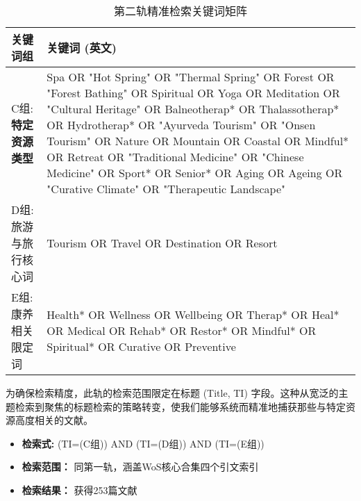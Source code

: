 \documentclass[UTF8, 12pt, a4paper, twoside]{ctexart}
\begin{document}
\begin{table}[htbp]
	\centering
	\caption{第二轨精准检索关键词矩阵}
	\label{tab:search_matrix_2_expanded}
	\begin{tabularx}{\textwidth}{lX}
		\toprule
		\textbf{关键词组}       & \textbf{关键词 (英文)}                                                                                                                                                                                                                                                                                                                                                                                                             \\
		\midrule
		C组: \textbf{特定资源类型} & Spa OR "Hot Spring" OR "Thermal Spring" OR Forest OR "Forest Bathing" OR Spiritual OR Yoga OR Meditation OR "Cultural Heritage" OR Balneotherap* OR Thalassotherap* OR Hydrotherap* OR "Ayurveda Tourism" OR "Onsen Tourism" OR Nature OR Mountain OR Coastal OR Mindful* OR Retreat OR "Traditional Medicine" OR "Chinese Medicine" OR Sport* OR Senior* OR Aging OR Ageing OR "Curative Climate" OR "Therapeutic Landscape" \\
		\addlinespace
		D组: 旅游与旅行核心词        & Tourism OR Travel OR Destination OR Resort                                                                                                                                                                                                                                                                                                                                                                                    \\
		\addlinespace
		E组: 康养相关限定词         & Health* OR Wellness OR Wellbeing OR Therap* OR Heal* OR Medical OR Rehab* OR Restor* OR Mindful* OR Spiritual* OR Curative OR Preventive                                                                                                                                                                                                                                                                                      \\
		\bottomrule
	\end{tabularx}
\end{table}

为确保检索精度，此轨的检索范围限定在标题 (Title, TI) 字段。这种从宽泛的主题检索到聚焦的标题检索的策略转变，使我们能够系统而精准地捕获那些与特定资源高度相关的文献。

\begin{itemize}[leftmargin=*, nosep]
	\item \textbf{检索式:} (TI=(C组)) AND (TI=(D组)) AND (TI=(E组))
	\item \textbf{检索范围：} 同第一轨，涵盖WoS核心合集四个引文索引
	\item \textbf{检索结果：} 获得253篇文献
\end{itemize}
\end{document}
